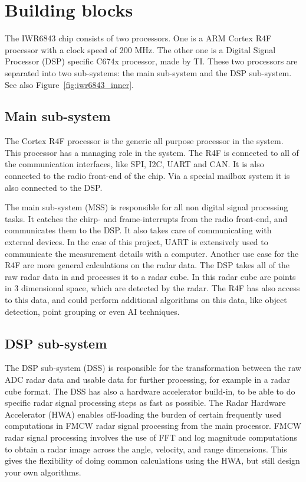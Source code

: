 \section{Building blocks}
\label{sec:building_blocks}
The IWR6843 chip consists of two processors. One is a ARM Cortex R4F processor with a clock speed of 200 MHz. The other one is a Digital Signal Processor (DSP) specific C674x processor, made by TI. These two processors are separated into two sub-systems: the main sub-system and the DSP sub-system. See also Figure~\ref{fig:iwr6843_inner}.

\subsection{Main sub-system}
The Cortex R4F processor is the generic all purpose processor in the system. This processor has a managing role in the system. The R4F is connected to all of the communication interfaces, like SPI, I2C, UART and CAN. It is also connected to the radio front-end of the chip. Via a special mailbox system it is also connected to the DSP. 

The main sub-system (MSS) is responsible for all non digital signal processing tasks. It catches the chirp- and frame-interrupts from the radio front-end, and communicates them to the DSP. It also takes care of communicating with external devices. In the case of this project, UART is extensively used to communicate the measurement details with a computer. Another use case for the R4F are more general calculations on the radar data. The DSP takes all of the raw radar data in and processes it to a radar cube. In this radar cube are points in 3 dimensional space, which are detected by the radar. The R4F has also access to this data, and could perform additional algorithms on this data, like object detection, point grouping or even AI techniques.

\subsection{DSP sub-system}
The DSP sub-system (DSS) is responsible for the transformation between the raw ADC radar data and usable data for further processing, for example in a radar cube format. The DSS has also a hardware accelerator build-in, to be able to do specific radar signal processing steps as fast as possible. The Radar Hardware Accelerator (HWA) enables off-loading the burden of certain frequently
used computations in FMCW radar signal processing from the main processor. FMCW radar signal processing involves the use of FFT and log magnitude computations to obtain a radar image across the angle, velocity, and range dimensions. This gives the flexibility of doing common calculations using the HWA, but still design your own algorithms.

